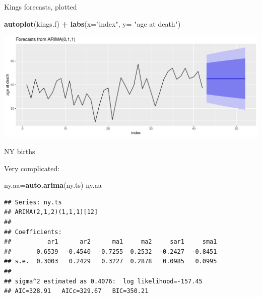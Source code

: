 \documentclass[
  ignorenonframetext,
]{beamer}
\newenvironment{Shaded}{\begin{snugshade}}{\end{snugshade}}
\newcommand{\DataTypeTok}[1]{\textcolor[rgb]{0.13,0.29,0.53}{#1}}
\newcommand{\KeywordTok}[1]{\textcolor[rgb]{0.13,0.29,0.53}{\textbf{#1}}}
\newcommand{\NormalTok}[1]{#1}
\newcommand{\OperatorTok}[1]{\textcolor[rgb]{0.81,0.36,0.00}{\textbf{#1}}}
\newcommand{\StringTok}[1]{\textcolor[rgb]{0.31,0.60,0.02}{#1}}
\begin{document}
\begin{frame}[fragile]{Kings forecasts, plotted}
\protect\hypertarget{kings-forecasts-plotted}{}

\begin{Shaded}
\begin{Highlighting}[]
\KeywordTok{autoplot}\NormalTok{(kings.f) }\OperatorTok{+}\StringTok{ }\KeywordTok{labs}\NormalTok{(}\DataTypeTok{x=}\StringTok{"index"}\NormalTok{, }\DataTypeTok{y=} \StringTok{"age at death"}\NormalTok{)}
\end{Highlighting}
\end{Shaded}

\includegraphics{slides_d29_files/figure-beamer/unnamed-chunk-574-1.pdf}

\end{frame}

\begin{frame}[fragile]{NY births}
\protect\hypertarget{ny-births}{}

Very complicated:

\small

\begin{Shaded}
\begin{Highlighting}[]
\NormalTok{ny.aa=}\KeywordTok{auto.arima}\NormalTok{(ny.ts)}
\NormalTok{ny.aa}
\end{Highlighting}
\end{Shaded}

\begin{verbatim}
## Series: ny.ts 
## ARIMA(2,1,2)(1,1,1)[12] 
## 
## Coefficients:
##          ar1      ar2      ma1     ma2     sar1     sma1
##       0.6539  -0.4540  -0.7255  0.2532  -0.2427  -0.8451
## s.e.  0.3003   0.2429   0.3227  0.2878   0.0985   0.0995
## 
## sigma^2 estimated as 0.4076:  log likelihood=-157.45
## AIC=328.91   AICc=329.67   BIC=350.21
\end{verbatim}

\normalsize

\end{frame}
\end{document}
